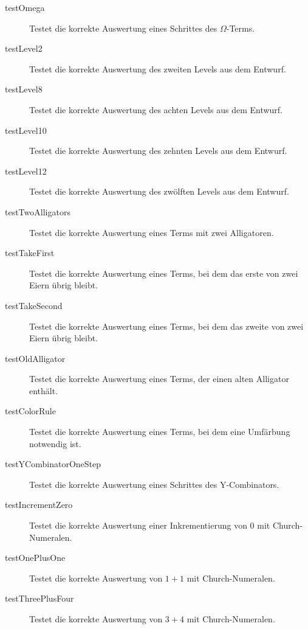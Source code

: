 \begin{description}
\item[testOmega]
Testet die korrekte Auswertung eines Schrittes des \(\Omega\)-Terms.

\item[testLevel2]
Testet die korrekte Auswertung des zweiten Levels aus dem Entwurf.

\item[testLevel8]
Testet die korrekte Auswertung des achten Levels aus dem Entwurf.

\item[testLevel10]
Testet die korrekte Auswertung des zehnten Levels aus dem Entwurf.

\item[testLevel12]
Testet die korrekte Auswertung des zwölften Levels aus dem Entwurf.

\item[testTwoAlligators]
Testet die korrekte Auswertung eines Terms mit zwei Alligatoren.

\item[testTakeFirst]
Testet die korrekte Auswertung eines Terms, bei dem das erste von zwei Eiern übrig bleibt.

\item[testTakeSecond]
Testet die korrekte Auswertung eines Terms, bei dem das zweite von zwei Eiern übrig bleibt.

\item[testOldAlligator]
Testet die korrekte Auswertung eines Terms, der einen alten Alligator enthält.

\item[testColorRule]
Testet die korrekte Auswertung eines Terms, bei dem eine Umfärbung notwendig ist.

\item[testYCombinatorOneStep]
Testet die korrekte Auswertung eines Schrittes des Y-Combinators.

\item[testIncrementZero]
Testet die korrekte Auswertung einer Inkrementierung von 0 mit Church-Numeralen.

\item[testOnePlusOne]
Testet die korrekte Auswertung von \(1+ 1\) mit Church-Numeralen.

\item[testThreePlusFour]
Testet die korrekte Auswertung von \(3 + 4\) mit Church-Numeralen.

\end{description}
